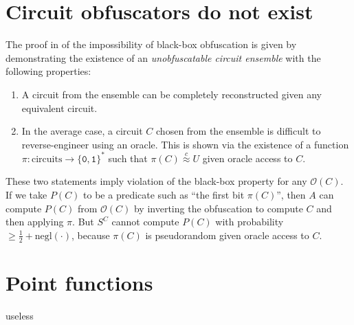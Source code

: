 \documentclass[10pt,twocolumn]{article}
\def\zero{\texttt{0}}
\def\one{\texttt{1}}
\def\bit{{\ensuremath{\{\zero,\one\}}}}
\def\obf{\ensuremath{\mathcal{O}}}
\def\negl{\text{negl}}
\def\cind{{\ensuremath{\stackrel{c}{\approx}}}}
\begin{document}
    \section{Circuit obfuscators do not exist}

    The proof in \cite{onThe(Im)possibility} of the impossibility of black-box obfuscation
    is given by demonstrating the existence of an \textit{unobfuscatable circuit ensemble}
    with the following properties:%

    \begin{enumerate}
      \item A circuit from the ensemble can be completely reconstructed given any equivalent circuit.
      \item In the average case, a circuit $C$ chosen from the ensemble is difficult to reverse-engineer using an oracle.
      This is shown via the existence of a function $\pi: \text{circuits}\to\bit^*$ such that $\pi(C)\cind U$
      given oracle access to $C$.
    \end{enumerate}

    These two statements imply violation of the black-box property for any $\obf(C)$.
    If we take $P(C)$ to be a predicate such as ``the first bit $\pi(C)$'',
    then $A$ can compute $P(C)$ from $\obf(C)$ by inverting the obfuscation to compute $C$ and then applying $\pi$.
    But $S^C$ cannot compute $P(C)$ with probability $\ge \frac{1}{2}+\negl(\cdot)$,
    because $\pi(C)$ is pseudorandom given oracle access to $C$.

  \section{Point functions}

    useless

  
  
\end{document}

